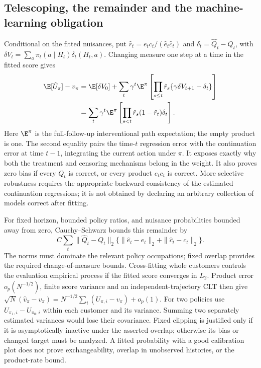 \subsection{Telescoping, the remainder and the machine-learning obligation}
Conditional on the fitted nuisances, put
$\hat r_t=e_tc_t/(\hat e_t\hat c_t)$ and
$\delta_t=\hat Q_t-Q_t$, with
$\delta V_t=\sum_a\pi_t(a\mid H_t)\delta_t(H_t,a)$.
Changing measure one step at a time in the fitted score gives
\begin{align*}
 \E[\hat U_\pi]-v_\pi
 &=\E[\delta V_0]
   +\sum_t\gamma^t\E^{\pi}
       \left[\prod_{s\le t}\hat r_s
       \{\gamma\delta V_{t+1}-\delta_t\}\right]\\
 &=\sum_t\gamma^t\E^{\pi}
       \left[\prod_{s<t}\hat r_s(1-\hat r_t)\delta_t\right].
\end{align*}
Here $\E^\pi$ is the full-follow-up interventional path expectation; the
empty product is one. The second equality pairs the time-$t$ regression
error with the continuation error at time $t-1$, integrating the current
action under $\pi$. It exposes exactly why both the treatment and censoring
mechanisms belong in the weight. It also proves zero bias if every $Q_t$
is correct, or every product $e_tc_t$ is correct. More selective robustness
requires the appropriate backward consistency of the estimated continuation
regressions; it is not obtained by declaring an arbitrary collection of
models correct after fitting.

For fixed horizon, bounded policy ratios, and nuisance probabilities
bounded away from zero, Cauchy--Schwarz bounds this remainder by
\[
 C\sum_t\|\hat Q_t-Q_t\|_2
   \{\|\hat e_t-e_t\|_2+\|\hat c_t-c_t\|_2\}.
\]
The norms must dominate the relevant policy occupations; fixed overlap
provides the required change-of-measure bounds. Cross-fitting whole
customers controls the evaluation empirical process if the fitted score
converges in $L_2$. Product error $o_p(N^{-1/2})$, finite score variance and
an independent-trajectory CLT then give
$\sqrt N(\hat v_\pi-v_\pi)=N^{-1/2}\sum_i(U_{\pi,i}-v_\pi)+o_p(1)$.
For two policies use $U_{\pi_1,i}-U_{\pi_0,i}$ within each customer and its
variance. Summing two separately estimated variances would lose their
covariance. Fixed clipping is justified only if it is asymptotically inactive
under the asserted overlap; otherwise its bias or changed target must be
analyzed. A fitted probability with a good calibration plot does not prove
exchangeability, overlap in unobserved histories, or the product-rate bound.


